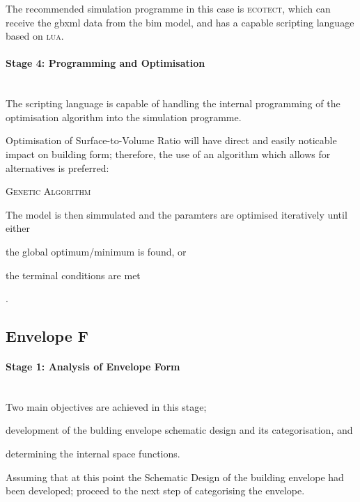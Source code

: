 The recommended simulation programme in this case is \textsc{ecotect}, which can receive the gbxml data from the bim model, and has a capable scripting language based on \textsc{lua}.

\paragraph{Stage 4: Programming and Optimisation}\mbox{}\\

The scripting language is capable of handling the internal programming of the optimisation algorithm into the simulation programme.

Optimisation of Surface-to-Volume Ratio will have direct and easily noticable impact on building form; therefore, the use of an algorithm which allows for alternatives is preferred:

\begin{compactenum}
\item \textsc{Genetic Algorithm}
\end{compactenum}

The model is then simmulated and the paramters are optimised iteratively until either \begin{inparaenum}[a)]\item the global optimum/minimum is found, or \item the terminal conditions are met\end{inparaenum}.


\clearpage
\subsection{Envelope F}

\paragraph{Stage 1: Analysis of Envelope Form}\mbox{}\\[2mm]

Two main objectives are achieved in this stage; \begin{inparaenum}[a)] \item development of the bulding envelope schematic design and its categorisation, and \item determining the internal space functions.\end{inparaenum}

Assuming that at this point the Schematic Design of the building envelope had been developed; proceed to the next step of categorising the envelope.

